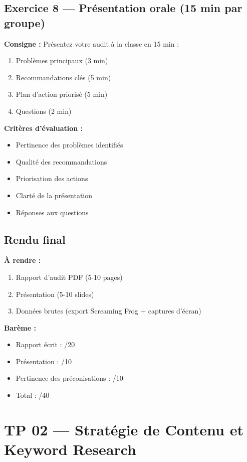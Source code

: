 \documentclass[12pt,a4paper]{report}
\begin{document}
\section{Exercice 8 --- Présentation orale (15 min par groupe)}

\textbf{Consigne :} Présentez votre audit à la classe en 15 min :
\begin{enumerate}
\item Problèmes principaux (3 min)
\item Recommandations clés (5 min)
\item Plan d'action priorisé (5 min)
\item Questions (2 min)
\end{enumerate}

\textbf{Critères d'évaluation :}
\begin{itemize}
\item Pertinence des problèmes identifiés
\item Qualité des recommandations
\item Priorisation des actions
\item Clarté de la présentation
\item Réponses aux questions
\end{itemize}

\section{Rendu final}

\textbf{À rendre :}
\begin{enumerate}
\item Rapport d'audit PDF (5-10 pages)
\item Présentation (5-10 slides)
\item Données brutes (export Screaming Frog + captures d'écran)
\end{enumerate}

\textbf{Barème :}
\begin{itemize}
\item Rapport écrit : /20
\item Présentation : /10
\item Pertinence des préconisations : /10
\item Total : /40
\end{itemize}

\chapter{TP 02 --- Stratégie de Contenu et Keyword Research}
\end{document}
